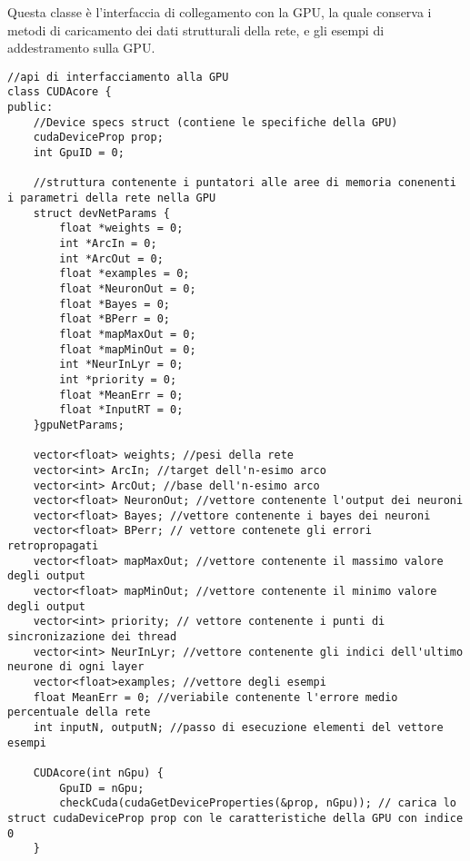 \documentclass[10pt,a4paper]{article}
\begin{document}
Questa classe è l'interfaccia di collegamento con la GPU, la quale conserva i metodi di caricamento dei dati strutturali della rete, e gli esempi di addestramento sulla GPU.
\begin{lstlisting}[style=mycuda, caption= classe di interfaccia alla GPU, captionpos=b]
//api di interfacciamento alla GPU
class CUDAcore {
public:
	//Device specs struct (contiene le specifiche della GPU)
	cudaDeviceProp prop; 
	int GpuID = 0;

	//struttura contenente i puntatori alle aree di memoria conenenti i parametri della rete nella GPU
	struct devNetParams {
		float *weights = 0;
		int *ArcIn = 0;
		int *ArcOut = 0;
		float *examples = 0;
		float *NeuronOut = 0;
		float *Bayes = 0;
		float *BPerr = 0;
		float *mapMaxOut = 0;
		float *mapMinOut = 0;
		int *NeurInLyr = 0;
		int *priority = 0;
		float *MeanErr = 0;
		float *InputRT = 0;
	}gpuNetParams;

	vector<float> weights; //pesi della rete
	vector<int> ArcIn; //target dell'n-esimo arco
	vector<int> ArcOut; //base dell'n-esimo arco
	vector<float> NeuronOut; //vettore contenente l'output dei neuroni
	vector<float> Bayes; //vettore contenente i bayes dei neuroni
	vector<float> BPerr; // vettore contenete gli errori retropropagati
	vector<float> mapMaxOut; //vettore contenente il massimo valore degli output
	vector<float> mapMinOut; //vettore contenente il minimo valore degli output
	vector<int> priority; // vettore contenente i punti di sincronizazione dei thread
	vector<int> NeurInLyr; //vettore contenente gli indici dell'ultimo neurone di ogni layer
	vector<float>examples; //vettore degli esempi
	float MeanErr = 0; //veriabile contenente l'errore medio percentuale della rete
	int inputN, outputN; //passo di esecuzione elementi del vettore esempi

	CUDAcore(int nGpu) {
		GpuID = nGpu;
		checkCuda(cudaGetDeviceProperties(&prop, nGpu)); // carica lo struct cudaDeviceProp prop con le caratteristiche della GPU con indice 0
	}
	
\end{lstlisting}
\end{document}

